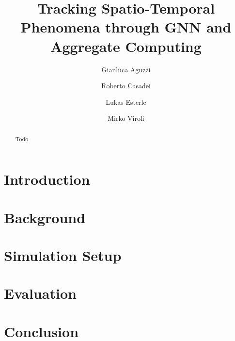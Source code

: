 \documentclass[runningheads]{llncs}
\begin{document}
%
\title{Tracking Spatio-Temporal Phenomena through GNN and Aggregate Computing} %
%
\author{Gianluca Aguzzi \and
Roberto Casadei \and
Lukas Esterle   \and
Mirko Viroli }
%
%

%
\maketitle              %
%
\begin{abstract}
Todo

\end{abstract}
%
\section{Introduction}

\section{Background}


\section{Simulation Setup}

\section{Evaluation}



\section{Conclusion}
\end{document}
